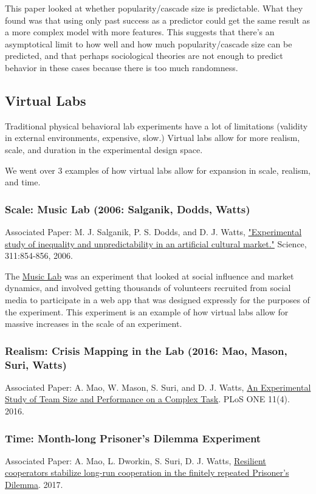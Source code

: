 \bigskip
This paper looked at whether popularity/cascade size is predictable. What they found was that using only past success as a predictor could get the same result as a more complex model with more features. This suggests that there's an asymptotical limit to how well and how much popularity/cascade size can be predicted, and that perhaps sociological theories are not enough to predict behavior in these cases because there is too much randomness.

\subsection{Virtual Labs}
Traditional physical behavioral lab experiments have a lot of limitations (validity in external environments, expensive, slow.) Virtual labs allow for more realism, scale, and duration in the experimental design space.

We went over 3 examples of how virtual labs allow for expansion in scale, realism, and time.

\subsubsection{Scale: Music Lab (2006: Salganik, Dodds, Watts)}
Associated Paper: M. J. Salganik, P. S. Dodds, and D. J. Watts, \href{https://www.princeton.edu/~mjs3/salganik_dodds_watts06_full.pdf}{"Experimental study of inequality and unpredictability in an artificial cultural market."} Science, 311:854-856, 2006.

\bigskip
The \href{http://www.princeton.edu/~mjs3/musiclab.shtml}{Music Lab} was an experiment that looked at social influence and market dynamics, and involved getting thousands of volunteers recruited from social media to participate in a web app that was designed expressly for the purposes of the experiment. This experiment is an example of how virtual labs allow for massive increases in the scale of an experiment.

\subsubsection{Realism: Crisis Mapping in the Lab (2016: Mao, Mason, Suri, Watts)}
Associated Paper: A. Mao, W. Mason, S. Suri, and D. J. Watts, \href{http://journals.plos.org/plosone/article?id=10.1371/journal.pone.0153048}{An Experimental Study of Team Size and Performance on a Complex Task}.  PLoS ONE 11(4). 2016.

\subsubsection{Time: Month-long Prisoner's Dilemma Experiment}
Associated Paper: A. Mao, L. Dworkin, S. Suri, D. J. Watts, \href{http://www.nature.com/articles/ncomms13800}{Resilient cooperators stabilize long-run cooperation in the finitely repeated Prisoner’s Dilemma}. 2017.